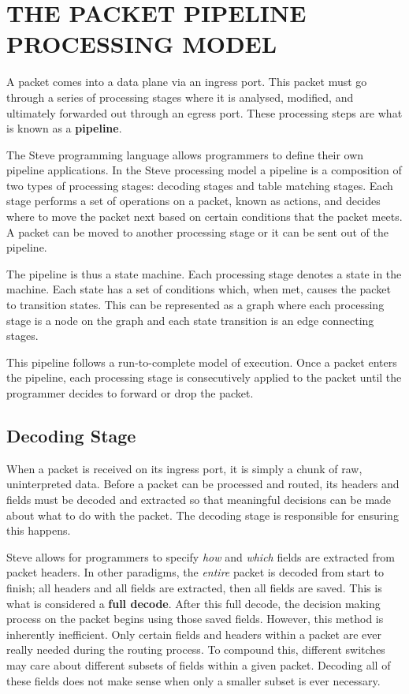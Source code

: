 \chapter{THE PACKET PIPELINE PROCESSING MODEL} \label{pipeline_model}

A packet comes into a data plane via an ingress port. This packet must go through a series of processing stages where it is analysed, modified, and ultimately forwarded out through an egress port. These processing steps are what is known as a \textbf{pipeline}. 

The Steve programming language allows programmers to define their own pipeline applications. In the Steve processing model a pipeline is a composition of two types of processing stages: decoding stages and table matching stages. Each stage performs a set of operations on a packet, known as actions, and decides where to move the packet next based on certain conditions that the packet meets. A packet can be moved to another processing stage or it can be sent out of the pipeline.

The pipeline is thus a state machine. Each processing stage denotes a state in the machine. Each state has a set of conditions which, when met, causes the packet to transition states. This can be represented as a graph where each processing stage is a node on the graph and each state transition is an edge connecting stages.

This pipeline follows a run-to-complete model of execution. Once a packet enters the pipeline, each processing stage is consecutively applied to the packet until the programmer decides to forward or drop the packet.

\section{Decoding Stage} \label{decoder_desc}

When a packet is received on its ingress port, it is simply a chunk of raw, uninterpreted data. Before a packet can be processed and routed, its headers and fields must be decoded and extracted so that meaningful decisions can be made about what to do with the packet. The decoding stage is responsible for ensuring this happens.

Steve allows for programmers to specify \textit{how} and \textit{which} fields are extracted from packet headers. In other paradigms, the \textit{entire} packet is decoded from start to finish; all headers and all fields are extracted, then all fields are saved. This is what is considered a \textbf{full decode}. After this full decode, the decision making process on the packet begins using those saved fields. However, this method is inherently inefficient. Only certain fields and headers within a packet are ever really needed during the routing process. To compound this, different switches may care about different subsets of fields within a given packet. Decoding all of these fields does not make sense when only a smaller subset is ever necessary. 

